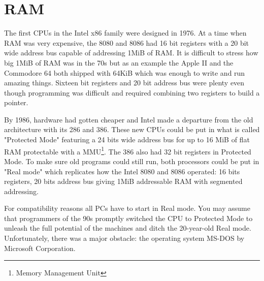 \documentclass[book.tex]{subfiles}
\begin{document}
\section{RAM}
The first CPUs in the Intel x86 family were designed in 1976. At a time when RAM was very expensive, the 8080 and 8086 had 16 bit registers with a 20 bit wide address bus capable of addressing 1MiB of RAM. It is difficult to stress how big 1MiB of RAM was in the 70s but as an example the Apple II and the Commodore 64 both shipped with 64KiB which was enough to write and run amazing things. Sixteen bit registers and 20 bit address bus were plenty even though programming was difficult and required combining two registers to build a pointer.\\
\par
By 1986, hardware had gotten cheaper and Intel made a departure from the old architecture with its 286 and 386. These new CPUs could be put in what is called "Protected Mode" featuring a 24 bits wide address bus for up to 16 MiB of flat RAM protectable with a MMU\footnote{Memory Management Unit}. The 386 also had 32 bit registers in Protected Mode. To make sure old programs could still run, both processors could be put in "Real mode" which replicates how the Intel 8080 and 8086 operated: 16 bits registers, 20 bits address bus giving 1MiB addressable RAM with segmented addressing.\\
\par
For compatibility reasons all PCs have to start in Real mode. You may assume that programmers of the 90s promptly switched the CPU to Protected Mode to unleash the full potential of the machines and ditch the 20-year-old Real mode. Unfortunately, there was a major obstacle: the operating system MS-DOS by Microsoft Corporation.
  
\end{document}
